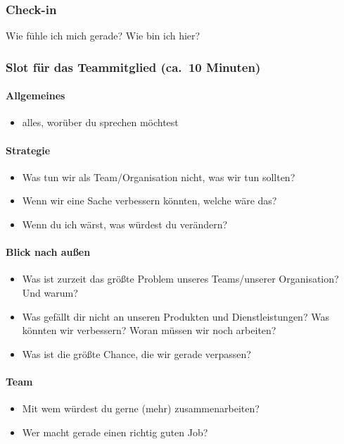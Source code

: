 \subsubsection{Check-in}

Wie fühle ich mich gerade? Wie bin ich hier?

\subsubsection{Slot für das Teammitglied (ca.~10 Minuten)}

\paragraph{Allgemeines}
\begin{itemize}
    \item alles, worüber du sprechen möchtest
\end{itemize}

\paragraph{Strategie}
\begin{itemize}
    \item Was tun wir als Team/Organisation nicht, was wir tun sollten?
    \item Wenn wir eine Sache verbessern könnten, welche wäre das?
    \item Wenn du ich wärst, was würdest du verändern?
\end{itemize}

\paragraph{Blick nach außen}
\begin{itemize}
    \item Was ist zurzeit das größte Problem unseres Teams/unserer Organisation? Und warum?
    \item Was gefällt dir nicht an unseren Produkten und Dienstleistungen? Was könnten wir verbessern? Woran müssen wir noch arbeiten?
    \item Was ist die größte Chance, die wir gerade verpassen?
\end{itemize}

\paragraph{Team}
\begin{itemize}
    \item Mit wem würdest du gerne (mehr) zusammenarbeiten?
    \item Wer macht gerade einen richtig guten Job?
\end{itemize}

